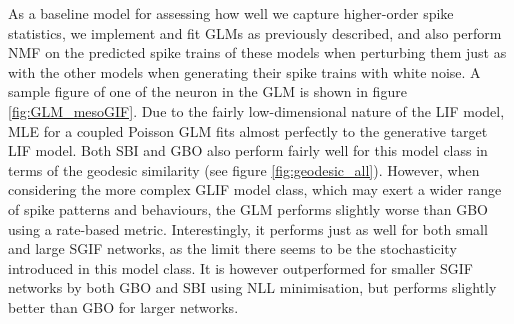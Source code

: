 \documentclass[mphil,deptreport,ianc]{infthesis} %
\begin{document}
As a baseline model for assessing how well we capture higher-order spike statistics, we implement and fit GLMs as previously described, and also perform NMF on the predicted spike trains of these models when perturbing them just as with the other models when generating their spike trains with white noise.
A sample figure of one of the neuron in the GLM is shown in figure \ref{fig:GLM_mesoGIF}.
Due to the fairly low-dimensional nature of the LIF model, MLE for a coupled Poisson GLM fits almost perfectly to the generative target LIF model.
Both SBI and GBO also perform fairly well for this model class in terms of the geodesic similarity (see figure \ref{fig:geodesic_all}).
However, when considering the more complex GLIF model class, which may exert a wider range of spike patterns and behaviours, the GLM performs slightly worse than GBO using a rate-based metric.
Interestingly, it performs just as well for both small and large SGIF networks, as the limit there seems to be the stochasticity introduced in this model class.
It is however outperformed for smaller SGIF networks by both GBO and SBI using NLL minimisation, but performs slightly better than GBO for larger networks.

\end{document}

